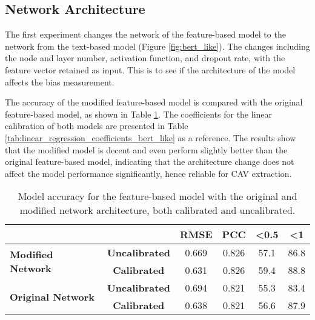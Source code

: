 \subsection{Network Architecture}
The first experiment changes the network of the feature-based model to the network from the text-based model (Figure \ref{fig:bert_like}). The changes including the node and layer number, activation function, and dropout rate, with the feature vector retained as input. This is to see if the architecture of the model affects the bias measurement.

The accuracy of the modified feature-based model is compared with the original feature-based model, as shown in Table \ref{tab:model_accuracy_bert_like}. The coefficients for the linear calibration of both models are presented in Table \ref{tab:linear_regression_coefficients_bert_like} as a reference. The results show that the modified model is decent and even perform slightly better than the original feature-based model, indicating that the architecture change does not affect the model performance significantly, hence reliable for CAV extraction.

\begin{table}[H]
    \centering
    \begin{tabular}{|lc|c|c|c|c|}
        \hline
        \multicolumn{2}{|l|}{\textbf{}}                                  & \textbf{RMSE}         & \textbf{PCC} & \textbf{\textless 0.5} & \textbf{\textless 1}        \\ \hline
        \multicolumn{1}{|l|}{\multirow{2}{*}{\textbf{Modified Network}}} & \textbf{Uncalibrated} & 0.669        & 0.826                  & 57.1                 & 86.8 \\ \cline{2-6}
        \multicolumn{1}{|l|}{}                                           & \textbf{Calibrated}   & 0.631        & 0.826                  & 59.4                 & 88.8 \\ \hline
        \multicolumn{1}{|l|}{\multirow{2}{*}{\textbf{Original Network}}} & \textbf{Uncalibrated} & 0.694        & 0.821                  & 55.3                 & 83.4 \\ \cline{2-6}
        \multicolumn{1}{|l|}{}                                           & \textbf{Calibrated}   & 0.638        & 0.821                  & 56.6                 & 87.9 \\ \hline
    \end{tabular}
    \caption{Model accuracy for the feature-based model with the original and modified network architecture, both calibrated and uncalibrated.}
    \label{tab:model_accuracy_bert_like}
\end{table}

